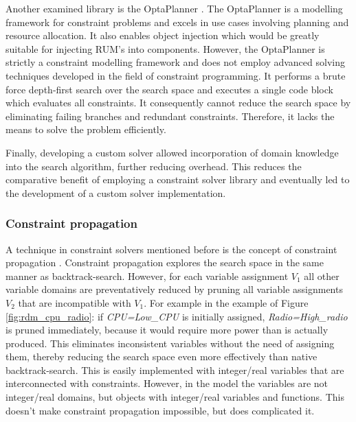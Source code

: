 Another examined library is the OptaPlanner \cite{web:opta}. The OptaPlanner is a modelling framework for constraint problems and excels in use cases involving planning and resource allocation. It also enables object injection which would be greatly suitable for injecting RUM's into components. However, the OptaPlanner is strictly a constraint modelling framework and does not employ advanced solving techniques developed in the field of constraint programming. It performs a brute force depth-first search over the search space and executes a single code block which evaluates all constraints. It consequently cannot reduce the search space by eliminating failing branches and redundant constraints. Therefore, it lacks the means to solve the problem efficiently.

Finally, developing a custom solver allowed incorporation of domain knowledge into the search algorithm, further reducing overhead. This reduces the comparative benefit of employing a constraint solver library and eventually led to the development of a custom solver implementation.

\subsubsection{Constraint propagation}
A technique in constraint solvers mentioned before is the concept of constraint propagation \cite{constraint_general}. Constraint propagation explores the search space in the same manner as backtrack-search. However, for each variable assignment $V_1$ all other variable domains are preventatively reduced by pruning all variable assignments $V_2$ that are incompatible with $V_1$. For example in the example of Figure \ref{fig:rdm_cpu_radio}: if \emph{CPU=Low\_CPU} is initially assigned, \emph{Radio=High\_radio} is pruned immediately, because it would require more power than is actually produced. This eliminates inconsistent variables without the need of assigning them, thereby reducing the search space even more effectively than native backtrack-search. This is easily implemented with integer/real variables that are interconnected with constraints. However, in the model the variables are not integer/real domains, but objects with integer/real variables and functions. This doesn't make constraint propagation impossible, but does complicated it.

